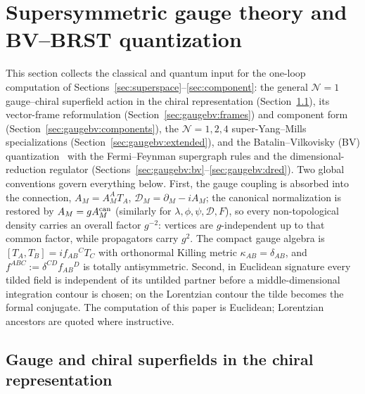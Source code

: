 \section{Supersymmetric gauge theory and BV--BRST quantization}\label{sec:gaugebv}

This section collects the classical and quantum input for the one-loop computation of Sections~\ref{sec:superspace}--\ref{sec:component}: the general $\mathcal N=1$ gauge--chiral superfield action in the chiral representation (Section~\ref{sec:gaugebv:action}), its vector-frame reformulation (Section~\ref{sec:gaugebv:frames}) and component form (Section~\ref{sec:gaugebv:components}), the $\mathcal N=1,2,4$ super-Yang--Mills specializations (Section~\ref{sec:gaugebv:extended}), and the Batalin--Vilkovisky (BV) quantization~\cite{BV} with the Fermi--Feynman supergraph rules and the dimensional-reduction regulator (Sections~\ref{sec:gaugebv:bv}--\ref{sec:gaugebv:dred}). Two global conventions govern everything below. First, the gauge coupling is absorbed into the connection, $A_M=A_M^AT_A$, $\mathcal D_M=\partial_M-iA_M$; the canonical normalization is restored by $A_M=gA_M^{\rm can}$ (similarly for $\lambda,\phi,\psi,\mathscr D,F$), so every non-topological density carries an overall factor $g^{-2}$: vertices are $g$-independent up to that common factor, while propagators carry $g^{2}$. The compact gauge algebra is $[T_A,T_B]=if_{AB}{}^CT_C$ with orthonormal Killing metric $\kappa_{AB}=\delta_{AB}$, and $f^{ABC}:=\delta^{CD}f_{AB}{}^D$ is totally antisymmetric. Second, in Euclidean signature every tilded field is independent of its untilded partner before a middle-dimensional integration contour is chosen; on the Lorentzian contour the tilde becomes the formal conjugate. The computation of this paper is Euclidean; Lorentzian ancestors are quoted where instructive.

\subsection{Gauge and chiral superfields in the chiral representation}\label{sec:gaugebv:action}

